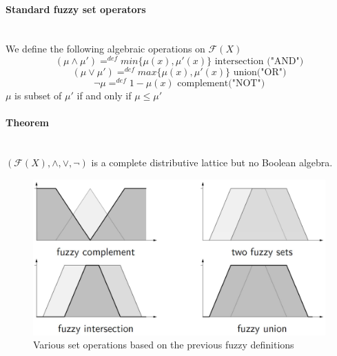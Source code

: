 \documentclass{article}
\begin{document}
\paragraph{Standard fuzzy set operators}\mbox{}\\
We define the following algebraic operations on $\mathcal{F}(X)$
$$(\mu\land\mu')=^{def} min\{\mu(x),\mu'(x)\}\text{ intersection ("AND")}$$
$$(\mu\lor\mu')=^{def} max\{\mu(x),\mu'(x)\} \text{ union("OR")}$$
$$\lnot\mu =^{def} 1-\mu(x)\text{ complement("NOT")}$$
$\mu$ is subset of $\mu'$ if and only if $\mu\leq\mu'$

\paragraph{Theorem}\mbox{}\\
$(\mathcal{F}(X),\land,\lor,\lnot)$ is a complete distributive lattice but no Boolean
algebra.
\begin{figure}[H]
    \centering
    \includegraphics[scale=0.3]{images/fuzzy-exa.png}
    \caption{Various set operations based on the previous fuzzy definitions}
\end{figure}
\end{document}
